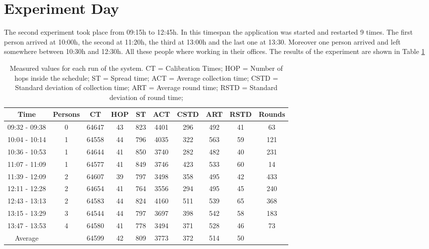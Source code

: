 \section{Experiment Day}
The second experiment took place from 09:15h to 12:45h. In this timespan the application was started and restarted 9 times. The first person arrived at 10:00h, the second at 11:20h, the third at 13:00h and the last one at 13:30. Moreover one person arrived and left somewhere between 10:30h and 12:30h. All these people where working in their offices.
The results of the experiment are shown in Table \ref{tab:DayTable}
\begin{table}[htbp]
 \caption{Measured values for each run of the system. CT = Calibration Times; HOP = Number of hops inside the schedule; ST = Spread time; ACT = Average collection time; CSTD = Standard deviation of collection time; ART = Average round time; RSTD = Standard deviation of round time;}
 \centering
 \begin{tabular}{c|c||c|c|c|c|c|c|c|c}
  Time & Persons & CT & HOP & ST & ACT & CSTD & ART & RSTD & Rounds\\ \toprule
  09:32 - 09:38 & 0 & 64647 & 43 & 823 & 4401 & 296 & 492 & 41 & 63\\ 
  10:04 - 10:14 & 1 & 64558 & 44 & 796 & 4035 & 322 & 563 & 59 & 121\\
  10:36 - 10:53 & 1 & 64644 & 41 & 850 & 3740 & 282 & 482 & 40 & 231\\
  11:07 - 11:09 & 1 & 64577 & 41 & 849 & 3746 & 423 & 533 & 60 & 14\\ 
  11:39 - 12:09 & 2 & 64607 & 39 & 797 & 3498 & 358 & 495 & 42 & 433\\
  12:11 - 12:28 & 2 & 64654 & 41 & 764 & 3556 & 294 & 495 & 45 & 240\\
  12:43 - 13:13 & 2 & 64583 & 44 & 824 & 4160 & 511 & 539 & 65 & 368\\
  13:15 - 13:29 & 3 & 64544 & 44 & 797 & 3697 & 398 & 542 & 58 & 183\\
  13:47 - 13:53 & 4 & 64580 & 41 & 778 & 3494 & 371 & 528 & 46 & 73\\ \toprule
  Average & & 64599 & 42 & 809 & 3773 & 372 & 514 & 50 & \\
 \end{tabular}
 \label{tab:DayTable}
\end{table}


